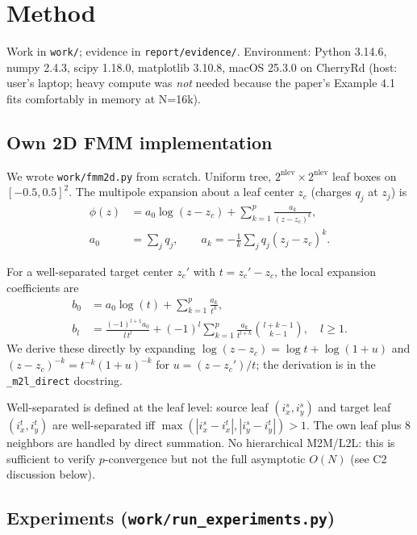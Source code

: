 \documentclass[11pt]{article}
\begin{document}
\section{Method}

Work in \texttt{work/}; evidence in \texttt{report/evidence/}. Environment:
Python 3.14.6, numpy 2.4.3, scipy 1.18.0, matplotlib 3.10.8, macOS 25.3.0
on CherryRd (host: user's laptop; heavy compute was \emph{not} needed
because the paper's Example 4.1 fits comfortably in memory at N=16k).

\subsection{Own 2D FMM implementation}

We wrote \texttt{work/fmm2d.py} from scratch. Uniform tree, $2^{\text{nlev}} \times 2^{\text{nlev}}$ leaf boxes on $[-0.5, 0.5]^2$. The multipole expansion
about a leaf center $z_c$ (charges $q_j$ at $z_j$) is
\begin{align*}
\phi(z) &= a_0 \log(z - z_c) + \sum_{k=1}^{p} \frac{a_k}{(z-z_c)^k}, \\
a_0 &= \sum_j q_j, \qquad a_k = -\frac{1}{k}\sum_j q_j (z_j - z_c)^k.
\end{align*}

For a well-separated target center $z_c'$ with $t = z_c' - z_c$, the local
expansion coefficients are
\begin{align*}
b_0 &= a_0 \log(t) + \sum_{k=1}^{p} \frac{a_k}{t^k}, \\
b_l &= \frac{(-1)^{l+1} a_0}{l\,t^l} + (-1)^l \sum_{k=1}^p \frac{a_k}{t^{l+k}} \binom{l+k-1}{k-1},\quad l \ge 1.
\end{align*}
We derive these directly by expanding $\log(z-z_c) = \log t + \log(1 + u)$
and $(z-z_c)^{-k} = t^{-k}(1+u)^{-k}$ for $u = (z-z_c')/t$; the derivation is
in the \texttt{\_m2l\_direct} docstring.

Well-separated is defined at the leaf level: source leaf $(i_x^s, i_y^s)$
and target leaf $(i_x^t, i_y^t)$ are well-separated iff
$\max(|i_x^s - i_x^t|, |i_y^s - i_y^t|) > 1$. The own leaf plus 8 neighbors
are handled by direct summation. No hierarchical M2M/L2L: this is sufficient
to verify $p$-convergence but not the full asymptotic $O(N)$ (see C2
discussion below).

\subsection{Experiments (\texttt{work/run\_experiments.py})}
\end{document}
